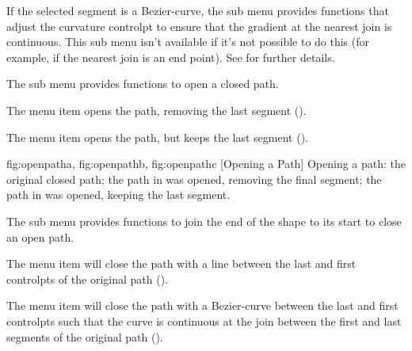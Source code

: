 If the selected segment is a \gls{Bezier-curve}, the
 sub menu provides functions that adjust
the curvature \gls*{controlpt} to ensure that the gradient at the
nearest join is continuous. This sub menu isn't available if it's not
possible to do this (for example, if the nearest join is an end
point). See  for further details.


The  sub menu provides functions to open a
closed path.


The  menu item
opens the path, removing the last segment ().


The  menu item
opens the path, but keeps the last segment ().

{
 {fig:openpatha}{}{},
 {fig:openpathb}{}{},
 {fig:openpathc}{}{}
}
  [Opening a Path]
  {Opening a path:  the original closed path;
    the path in  was opened,
   removing the final segment;  the path in 
    was opened, keeping the last segment.}


The  sub menu provides functions to join
the end of the \gls{shape} to its start to close an open path.


The  menu item will
close the path with a line between the last and first
\glspl*{controlpt} of the original path ().


The  menu item will
close the path with a \gls{Bezier-curve} between the last and first
\glspl*{controlpt} such that the curve is continuous at the join
between the first and last segments of the original path
().


